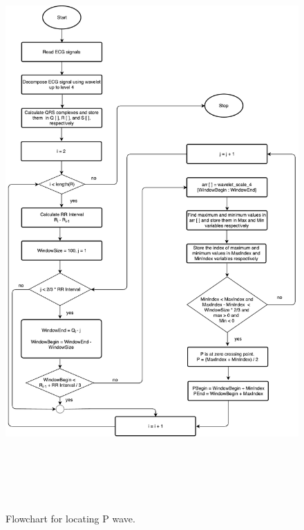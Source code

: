\begin{figure}[htpb]
	\centering
	\includegraphics[width=25cm,height=22cm,keepaspectratio=true]{images/p_Wave.pdf}
	\caption{
		Flowchart for locating P wave.
	}
	\label{fig:p_peaks_flow_chart}
\end{figure}

